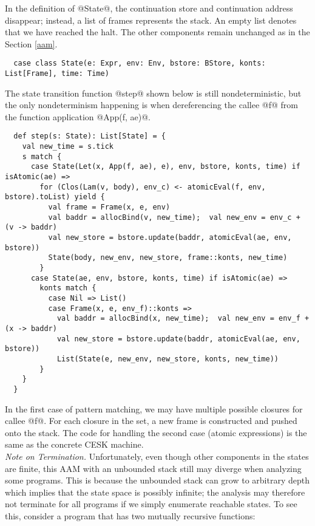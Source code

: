 \documentclass[acmsmall, review]{acmart}\settopmatter{}
\begin{document}
In the definition of @State@, the continuation store and continuation address disappear;
instead, a list of frames represents the stack. An empty list denotes that we have reached 
the halt. The other components remain unchanged as in the Section \ref{aam}.

\begin{lstlisting}
  case class State(e: Expr, env: Env, bstore: BStore, konts: List[Frame], time: Time)
\end{lstlisting}

The state transition function @step@ shown below is still nondeterministic, but the only 
nondeterminism happening is when dereferencing the callee @f@ from the function application 
@App(f, ae)@.

\begin{lstlisting}
  def step(s: State): List[State] = {
    val new_time = s.tick
    s match {
      case State(Let(x, App(f, ae), e), env, bstore, konts, time) if isAtomic(ae) =>
        for (Clos(Lam(v, body), env_c) <- atomicEval(f, env, bstore).toList) yield {
          val frame = Frame(x, e, env)
          val baddr = allocBind(v, new_time);  val new_env = env_c + (v -> baddr)
          val new_store = bstore.update(baddr, atomicEval(ae, env, bstore))
          State(body, new_env, new_store, frame::konts, new_time)
        }
      case State(ae, env, bstore, konts, time) if isAtomic(ae) =>
        konts match {
          case Nil => List()
          case Frame(x, e, env_f)::konts =>
            val baddr = allocBind(x, new_time);  val new_env = env_f + (x -> baddr)
            val new_store = bstore.update(baddr, atomicEval(ae, env, bstore))
            List(State(e, new_env, new_store, konts, new_time))
        }
    }
  }
\end{lstlisting}

In the first case of pattern matching, we may have multiple possible closures for callee @f@.
For each closure in the set, a new frame is constructed and pushed onto the stack.
The code for handling the second case (atomic expressions) is the same as the concrete CESK machine. \\

\textit{Note on Termination.}
Unfortunately, even though other components in the states are finite, this AAM with an unbounded
stack still may diverge when analyzing some programs.
This is because the unbounded stack can grow to arbitrary depth which implies that the state
space is possibly infinite; the analysis may therefore not terminate for all programs if we
simply enumerate reachable states. To see this, consider a program that has two mutually
recursive functions:
\end{document}
